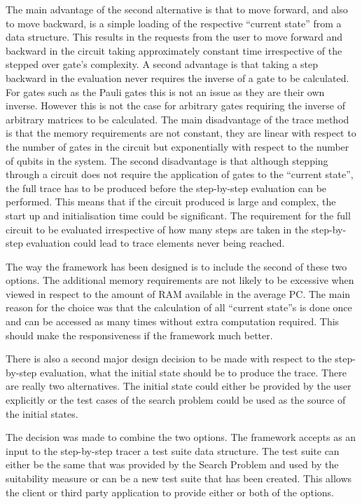 The main advantage of the second alternative is that to move forward, and also to move backward, is a simple loading of the respective ``current state'' from a data structure.
This results in the requests from the user to move forward and backward in the circuit taking approximately constant time irrespective of the stepped over gate's complexity.
A second advantage is that taking a step backward in the evaluation never requires the inverse of a gate to be calculated.
For gates such as the Pauli gates this is not an issue as they are their own inverse.
However this is not the case for arbitrary gates requiring the inverse of arbitrary matrices to be calculated.
The main disadvantage of the trace method is that the memory requirements are not constant, they are linear with respect to the number of gates in the circuit but exponentially with respect to the number of qubits in the system.
The second disadvantage is that although stepping through a circuit does not require the application of gates to the ``current state'', the full trace has to be produced before the step-by-step evaluation can be performed.
This means that if the circuit produced is large and complex, the start up and initialisation time could be significant.
The requirement for the full circuit to be evaluated irrespective of how many steps are taken in the step-by-step evaluation could lead to trace elements never being reached.

The way the framework has been designed is to include the second of these two options.
The additional memory requirements are not likely to be excessive when viewed in respect to the amount of RAM available in the average PC.
The main reason for the choice was that the calculation of all ``current state''s is done once and can be accessed as many times without extra computation required.
This should make the responsiveness if the framework much better.

There is also a second major design decision to be made with respect to the step-by-step evaluation, what the initial state should be to produce the trace.
There are really two alternatives.
The initial state could either be provided by the user explicitly or the test cases of the search problem could be used as the source of the initial  states.

The decision was made to combine the two options.
The framework accepts as an input to the step-by-step tracer a test suite data structure.
The test suite can either be the same that was provided by the Search Problem and used by the suitability measure or can be a new test suite that has been created.
This allows the client or third party application to provide either or both of the options.

